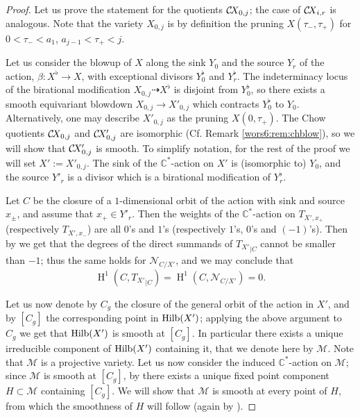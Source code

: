 \documentclass[10pt,a4paper]{article}
\numberwithin{equation}{section}
\theoremstyle{definition}
\theoremstyle{remark}
\DeclareMathOperator{\HH}{H}
\def\C{{\mathbb C}}
\def\cM{{\mathcal M}}
\def\cN{{\mathcal{N}}}
\def\operatorname#1{\mathop{\rm #1}\nolimits}
\def\Hilb{\operatorname{Hilb}}
\def\CX{\mathcal{C}\!X\hspace{-0.5pt}}
\begin{document}
\begin{proof}
Let us prove the statement for the quotients $\CX_{0,j}$; the case of $\CX_{i,r}$ is analogous.
Note that the variety $X_{0,j}$ is by definition the pruning $X(\tau_-,\tau_+)$ for $0 < \tau_- <a_1$, $a_{j-1} < \tau_+ < j$.  

Let us consider the blowup of $X$ along the sink $Y_0$ and the source $Y_r$ of the action, $\beta: X^\flat \to X$, with exceptional divisors $Y_0^\flat$ and $Y_r^\flat$.
The indeterminacy locus of the birational modification $X_{0,j} \dashrightarrow X^\flat$ is disjoint from $Y_0^\flat$, so there exists a smooth equivariant blowdown $X_{0,j} \to X'_{0,j}$  which contracts $Y_0^\flat$ to $Y_0$. Alternatively, one may describe $X'_{0,j}$ as the pruning $X(0,\tau_+)$.
The Chow quotients $\CX_{0,j}$ and $\CX'_{0,j}$ are isomorphic (Cf. Remark \ref{wors6:rem:chblow}),
so we will show that $\CX'_{0,j}$ is smooth. To simplify notation, for the rest of the proof we will set $X':=X'_{0,j}$.
The sink of the $\C^*$-action on $X'$ is (isomorphic to) $Y_0$, and the source $Y'_r$ is a divisor  which is a birational modification of $Y_r^\flat$.

Let $C$ be the closure of a $1$-dimensional orbit of the action with sink and source $x_\pm$, and assume that $x_+\in Y'_r$. Then the weights of the $\C^*$-action on $T_{X',x_+}$ (respectively $T_{X',x_-}$) are all $0$'s and $1$'s (respectively $1$'s, $0$'s and $(-1)$'s). Then by \cite[Lemma 2.16]{wors6-WORS1} we get that the degrees of the direct summands of ${T_{X'}}_{|C}$ cannot be smaller than $-1$; thus the same holds for $\cN_{C/X'}$, and we may conclude that 
\begin{equation}\label{wors6:eq:vanish}
\HH^1(C,{T_{X'}}_{|C})=\HH^1(C,\cN_{C/X'})=0.
\end{equation}


Let us now denote by $C_g$ the closure of the general orbit of the action in $X'$, and by $[C_g]$ the corresponding point in $\Hilb(X')$; applying the above argument to $C_g$ we get that $\Hilb(X')$ is smooth at $[C_{g}]$. In particular there exists a unique irreducible component  of $\Hilb(X')$ containing it, that we denote here by $\cM$. Note that $\cM$ is a projective variety.
Let us now consider the induced $\C^*$-action on $\cM$; since $\cM$ is smooth at $[C_g]$, by \cite[Theorem 2.5]{wors6-BB} there exists a unique fixed point component  $H \subset \cM$ containing $[C_g]$. We will show that $\cM$ is smooth at every point of $H$, from which the smoothness of $H$ will follow (again by \cite[Theorem 2.5]{wors6-BB}). 


\end{proof}
\end{document}
